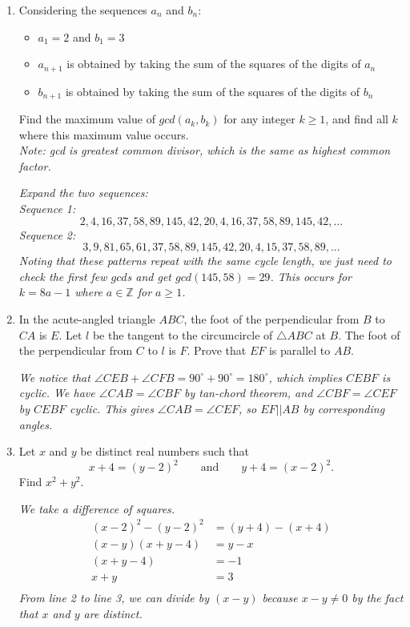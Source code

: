 \documentclass{article}
\begin{document}
\begin{enumerate}[1.]
\item %
Considering the sequences $a_n$ and $b_n$:
\begin{itemize}
\item $a_1=2$ and $b_1=3$
\item $a_{n+1}$ is obtained by taking the sum of the squares of the digits of $a_{n}$
\item $b_{n+1}$ is obtained by taking the sum of the squares of the digits of $b_n$
\end{itemize}
Find the maximum value of $gcd(a_k,b_k)$ for any integer $k\geq 1$, and find all $k$ where this maximum value occurs.\\
\textit{Note: gcd is greatest common divisor, which is the same as highest common factor.}

{\itshape Expand the two sequences:\\
Sequence 1: $$2,4,16,37,58,89,145,42,20,4,16,37,58,89,145,42,...$$ Sequence 2: $$3,9,81,65,61,37,58,89,145,42,20,4,15,37,58,89,...$$ Noting that these patterns repeat with the same cycle length, we just need to check the first few $gcd$s and get $gcd(145,58)=29$. This occurs for $k=8a-1$ where $a\in \mathbb{Z}$ for $a\geq 1$.}


\item In the acute-angled triangle $ABC$, the foot of the perpendicular from $B$ to $CA$ is $E$. Let $l$ be the tangent to the circumcircle of $\triangle ABC$ at $B$. The foot of the perpendicular from $C$ to $l$ is $F$. Prove that $EF$ is parallel to $AB$.

{\itshape We notice that $\angle CEB + \angle CFB = 90^\circ + 90^\circ = 180^\circ$, which implies $CEBF$ is cyclic. We have $\angle CAB = \angle CBF$ by tan-chord theorem, and $\angle CBF = \angle CEF$ by $CEBF$ cyclic. This gives $\angle CAB = \angle CEF$, so $EF||AB$ by corresponding angles.}

\item %
Let $x$ and $y$ be distinct real numbers such that $$x + 4 = (y - 2)^2 \qquad\text{and}\qquad y + 4 = (x - 2)^2.$$
Find $x^2 + y^2$.

{\itshape We take a difference of squares.
\begin{align*}
(x - 2)^2 - (y - 2)^2 &= (y + 4) - (x + 4)\\
(x - y)(x + y - 4) &= y - x\\
(x + y - 4) &= -1\\
x + y &= 3\\
\end{align*}
From line 2 to line 3, we can divide by $(x - y)$ because $x - y \neq 0$ by the fact that $x$ and $y$ are distinct.

}
\end{enumerate}
\end{document}
